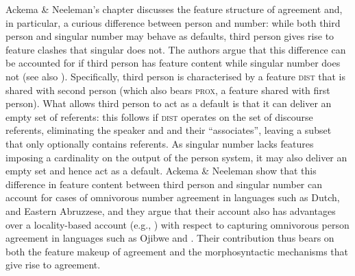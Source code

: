 \documentclass[output=paper]{langsci/langscibook}
\begin{document}
Ackema \& Neeleman’s chapter discusses the feature structure of agreement and, in particular, a curious difference between person and number: while both third person and singular number may behave as defaults, third person gives rise to feature clashes that singular does not. The authors argue that this difference can be accounted for if third person has feature content while singular number does not (see also \citealt{Nevins2007,Nevins2011}). Specifically, third person is characterised by a feature \textsc{dist} that is shared with second person (which also bears \textsc{prox}, a feature shared with first person). What allows third person to act as a default is that it can deliver an empty set of referents: this follows if \textsc{dist} operates on the set of discourse referents, eliminating the speaker and  and their ``associates'', leaving a subset that only optionally contains referents. As singular number lacks features imposing a cardinality on the output of the person system, it may also deliver an empty set and hence act as a default. Ackema \& Neeleman show that this difference in feature content between third person and singular number can account for cases of omnivorous number agreement in languages such as Dutch,  and Eastern Abruzzese, and they argue that their account also has advantages over a locality-based  account (e.g., \citealt{Preminger2014}) with respect to capturing omnivorous person agreement in languages such as Ojibwe and . Their contribution thus bears on both the feature makeup of agreement and the morphosyntactic mechanisms that give rise to agreement.
\end{document}
